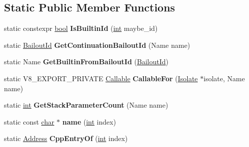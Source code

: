 \subsection*{Static Public Member Functions}
\begin{DoxyCompactItemize}
\item 
\mbox{\label{classv8_1_1internal_1_1Builtins_ac14e46f164e0d99a1be4131f46387131}} 
static constexpr \mbox{\hyperlink{classbool}{bool}} {\bfseries Is\+Builtin\+Id} (\mbox{\hyperlink{classint}{int}} maybe\+\_\+id)
\item 
\mbox{\label{classv8_1_1internal_1_1Builtins_a127e5ea4e1b958eafde365c530a3d5d7}} 
static \mbox{\hyperlink{classv8_1_1internal_1_1BailoutId}{Bailout\+Id}} {\bfseries Get\+Continuation\+Bailout\+Id} (Name name)
\item 
\mbox{\label{classv8_1_1internal_1_1Builtins_a2909f75cc13bca0ea4de4b78097a622f}} 
static Name {\bfseries Get\+Builtin\+From\+Bailout\+Id} (\mbox{\hyperlink{classv8_1_1internal_1_1BailoutId}{Bailout\+Id}})
\item 
\mbox{\label{classv8_1_1internal_1_1Builtins_ab1f13fa08873cef8c19a607fdf898b95}} 
static V8\+\_\+\+E\+X\+P\+O\+R\+T\+\_\+\+P\+R\+I\+V\+A\+TE \mbox{\hyperlink{classv8_1_1internal_1_1Callable}{Callable}} {\bfseries Callable\+For} (\mbox{\hyperlink{classv8_1_1internal_1_1Isolate}{Isolate}} $\ast$isolate, Name name)
\item 
\mbox{\label{classv8_1_1internal_1_1Builtins_ac6eb723b31ff197d25c7433121470e33}} 
static \mbox{\hyperlink{classint}{int}} {\bfseries Get\+Stack\+Parameter\+Count} (Name name)
\item 
\mbox{\label{classv8_1_1internal_1_1Builtins_a673b1730cd5306a971e601ab8a8b2722}} 
static const \mbox{\hyperlink{classchar}{char}} $\ast$ {\bfseries name} (\mbox{\hyperlink{classint}{int}} index)
\item 
\mbox{\label{classv8_1_1internal_1_1Builtins_aa48ca9f9e47cffa7e90a63cbb5c2ff45}} 
static \mbox{\hyperlink{classuintptr__t}{Address}} {\bfseries Cpp\+Entry\+Of} (\mbox{\hyperlink{classint}{int}} index)

\end{DoxyCompactItemize}
